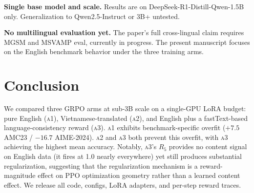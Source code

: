 \documentclass[11pt]{article}
\newcommand{\armA}{\textsc{a1}}
\newcommand{\armB}{\textsc{a2}}
\newcommand{\armC}{\textsc{a3}}
\begin{document}
\textbf{Single base model and scale.} Results are on
DeepSeek-R1-Distill-Qwen-1.5B only. Generalization to Qwen2.5-Instruct or 3B+ untested.

\textbf{No multilingual evaluation yet.} The paper's full cross-lingual claim
requires MGSM and MSVAMP eval, currently in progress. The present manuscript
focuses on the English benchmark behavior under the three training arms.

\section{Conclusion}
\label{sec:conclusion}
We compared three GRPO arms at sub-3B scale on a single-GPU LoRA budget: pure
English (\armA{}), Vietnamese-translated (\armB{}), and English plus a
fastText-based language-consistency reward (\armC{}). \armA{} exhibits
benchmark-specific overfit ($+7.5$ AMC23 / $-16.7$ AIME-2024). \armB{} and
\armC{} both prevent this overfit, with \armC{} achieving the highest mean
accuracy. Notably, \armC{}'s $R_5$ provides no content signal on English data
(it fires at 1.0 nearly everywhere) yet still produces substantial regularization,
suggesting that the regularization mechanism is a reward-magnitude effect on PPO
optimization geometry rather than a learned content effect. We release all code,
configs, LoRA adapters, and per-step reward traces.




\appendix

\end{document}
